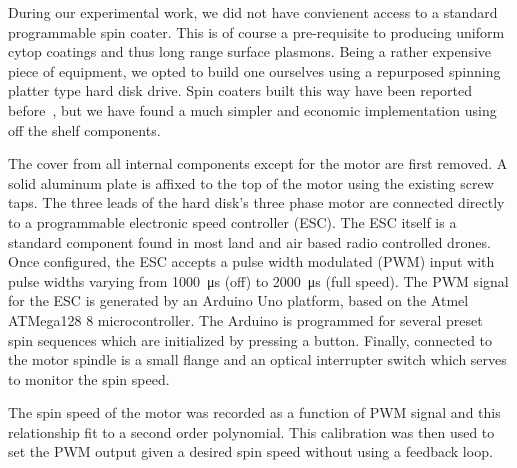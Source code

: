 During our experimental work, we did not have convienent access to a
standard programmable spin coater.  This is of course a pre-requisite to
producing uniform cytop coatings and thus long range surface plasmons.
Being a rather expensive piece of equipment, we opted to build one
ourselves using a repurposed spinning platter type hard disk drive.  Spin
coaters built this way have been reported before~\cite{bianchi2006spin},
but we have found a much simpler and economic implementation using off the
shelf components.

The cover from all internal components except for the motor are first
removed.  A solid aluminum plate is affixed to the top of the motor using
the existing screw taps.  The three leads of the hard disk's three phase
motor are connected directly to a programmable electronic speed controller
(ESC).  The ESC itself is a standard component found in most land and air
based radio controlled drones.  Once configured, the ESC accepts a pulse
width modulated (PWM) input with pulse widths varying from
\SI{1000}{\micro\second} (off) to \SI{2000}{\micro\second} (full speed).
The PWM signal for the ESC is generated by an Arduino Uno platform, based
on the Atmel ATMega128 \SI{8}{\bit} microcontroller.  The Arduino is
programmed for several preset spin sequences which are initialized by
pressing a button.  Finally, connected to the motor spindle is a small
flange and an optical interrupter switch which serves to monitor the spin
speed.  

The spin speed of the motor was recorded as a function of PWM signal and
this relationship fit to a second order polynomial.  This calibration was
then used to set the PWM output given a desired spin speed without using a
feedback loop.

